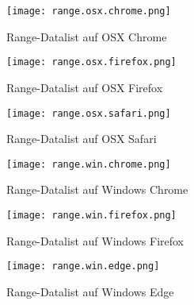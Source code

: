 
\begin{figure}[!htb]
    \centering
    \begin{minipage}[b]{0.28\textwidth}
        \centering
        \texttt{[image: range.osx.chrome.png]}
        \caption{Range-Datalist auf OSX Chrome}
        \label{img:rangeOsxChromeDatalist}
    \end{minipage}
    \hfill
    \begin{minipage}[b]{0.28\textwidth}
        \centering
        \texttt{[image: range.osx.firefox.png]}
        \caption{Range-Datalist auf OSX Firefox}
        \label{img:rangeOsxFirefoxDatalist}
    \end{minipage}
    \hfill
    \begin{minipage}[b]{0.28\textwidth}
        \centering
        \texttt{[image: range.osx.safari.png]}
        \caption{Range-Datalist auf OSX Safari}
        \label{img:rangeOsxSafariDatalist}
    \end{minipage}
\end{figure}

\begin{figure}[!htb]
    \centering
    \begin{minipage}[b]{0.28\textwidth}
        \centering
        \texttt{[image: range.win.chrome.png]}
        \caption{Range-Datalist auf Windows Chrome}
        \label{img:rangeWinChromeDatalist}
    \end{minipage}
    \hfill
    \begin{minipage}[b]{0.28\textwidth}
        \centering
        \texttt{[image: range.win.firefox.png]}
        \caption{Range-Datalist auf Windows Firefox}
        \label{img:rangeWinFirefoxDatalist}
    \end{minipage}
    \hfill
    \begin{minipage}[b]{0.28\textwidth}
        \centering
        \texttt{[image: range.win.edge.png]}
        \caption{Range-Datalist auf Windows Edge}
        \label{img:rangeWinEdgeDatalist}
    \end{minipage}
\end{figure}


